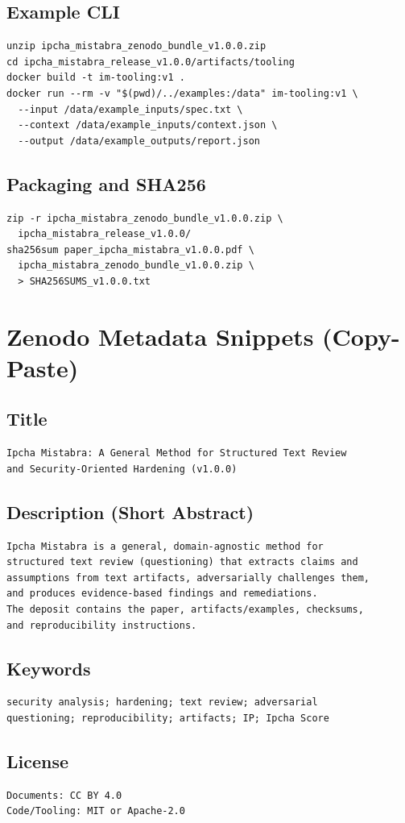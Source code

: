 \documentclass[11pt,a4paper]{article}
\begin{document}
\subsection*{Example CLI}
\begin{verbatim}
unzip ipcha_mistabra_zenodo_bundle_v1.0.0.zip
cd ipcha_mistabra_release_v1.0.0/artifacts/tooling
docker build -t im-tooling:v1 .
docker run --rm -v "$(pwd)/../examples:/data" im-tooling:v1 \
  --input /data/example_inputs/spec.txt \
  --context /data/example_inputs/context.json \
  --output /data/example_outputs/report.json
\end{verbatim}

\subsection*{Packaging and SHA256}
\begin{verbatim}
zip -r ipcha_mistabra_zenodo_bundle_v1.0.0.zip \
  ipcha_mistabra_release_v1.0.0/
sha256sum paper_ipcha_mistabra_v1.0.0.pdf \
  ipcha_mistabra_zenodo_bundle_v1.0.0.zip \
  > SHA256SUMS_v1.0.0.txt
\end{verbatim}

\section{Zenodo Metadata Snippets (Copy-Paste)}

\subsection*{Title}
\begin{verbatim}
Ipcha Mistabra: A General Method for Structured Text Review
and Security-Oriented Hardening (v1.0.0)
\end{verbatim}

\subsection*{Description (Short Abstract)}
\begin{verbatim}
Ipcha Mistabra is a general, domain-agnostic method for
structured text review (questioning) that extracts claims and
assumptions from text artifacts, adversarially challenges them,
and produces evidence-based findings and remediations.
The deposit contains the paper, artifacts/examples, checksums,
and reproducibility instructions.
\end{verbatim}

\subsection*{Keywords}
\begin{verbatim}
security analysis; hardening; text review; adversarial
questioning; reproducibility; artifacts; IP; Ipcha Score
\end{verbatim}

\subsection*{License}
\begin{verbatim}
Documents: CC BY 4.0
Code/Tooling: MIT or Apache-2.0
\end{verbatim}
\end{document}
